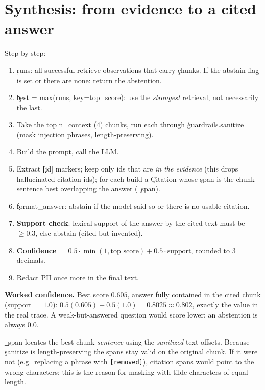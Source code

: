 \section{Synthesis: from evidence to a cited answer}
Step by step:
\begin{enumerate}
 \item \c{runs}: all successful retrieve observations that carry \c{chunks}. If the abstain flag is set or there are none: return the abstention.
 \item \c{best = max(runs, key=top\_score)}: use the \emph{strongest} retrieval, not necessarily the last.
 \item Take the top \c{n\_context} (4) chunks, run each through \c{guardrails.sanitize} (mask injection phrases, length-preserving).
 \item Build the prompt, call the LLM.
 \item Extract \c{[id]} markers; keep only ids that are \emph{in the evidence} (this drops hallucinated citation ids); for each build a \c{Citation} whose \c{span} is the chunk sentence best overlapping the answer (\c{\_span}).
 \item \c{format\_answer}: abstain if the model said so or there is no usable citation.
 \item \textbf{Support check}: lexical support of the answer by the cited text must be $\ge0.3$, else abstain (cited but invented).
 \item \textbf{Confidence} $=0.5\cdot\min(1,\text{top\_score})+0.5\cdot\text{support}$, rounded to 3 decimals.
 \item Redact PII once more in the final text.
\end{enumerate}
\begin{keyidea}
\textbf{Worked confidence.} Best score $0.605$, answer fully contained in the cited chunk (support $=1.0$): $0.5(0.605)+0.5(1.0)=0.8025\approx0.802$, exactly the value in the real trace. A weak-but-answered question would score lower; an abstention is always $0.0$.
\end{keyidea}
\begin{gotcha}
\c{\_span} locates the best chunk \emph{sentence} using the \emph{sanitized} text offsets. Because \c{sanitize} is length-preserving the spans stay valid on the original chunk. If it were not (e.g.\ replacing a phrase with \texttt{[removed]}), citation spans would point to the wrong characters: this is the reason for masking with tilde characters of equal length.
\end{gotcha}

